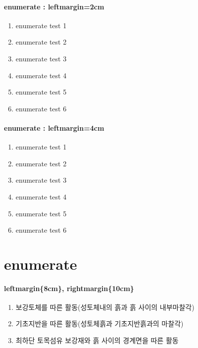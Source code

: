 		\paragraph{enumerate : leftmargin=2cm}
			\begin{enumerate}[ leftmargin=2cm ]
			\setlength\topsep{0.0em}
			\setlength\itemsep{-1.0em}
			\setlength{}
			\setlength{}
	
			\item	enumerate test 1
			\item	enumerate test 2
			\item	enumerate test 3
			\item	enumerate test 4
			\item	enumerate test 5
			\item	enumerate test 6
			\end{enumerate}


		\paragraph{enumerate : leftmargin=4cm}
			\begin{enumerate}[leftmargin=4cm]
			\setlength\topsep{0.0em}
			\setlength\itemsep{-1.0em}
			\setlength\leftmargin{0cm}
			\setlength\rightmargin{6cm}
	
			\setlength{}
			\setlength{}
			\setlength\listparindent{0.0em}
	
			\item	enumerate test 1
			\item	enumerate test 2
			\item	enumerate test 3
			\item	enumerate test 4
			\item	enumerate test 5
			\item	enumerate test 6
			\end{enumerate}


		

	\section{enumerate}


		\paragraph{ leftmargin\{8cm\}, rightmargin\{10cm\} } 
			\begin{enumerate}
			\setlength\leftmargin{8cm}
			\setlength\rightmargin{10cm}
			\item	보강토체를 따른 활동(성토체내의 흙과 흙 사이의 내부마찰각) 
			\item	기초지반을 따른 활동(성토체흙과 기초지반흙과의 마찰각) 
			\item	최하단 토목섬유 보강재와 흙 사이의 경계면을 따른 활동 
			\end{enumerate}
	
